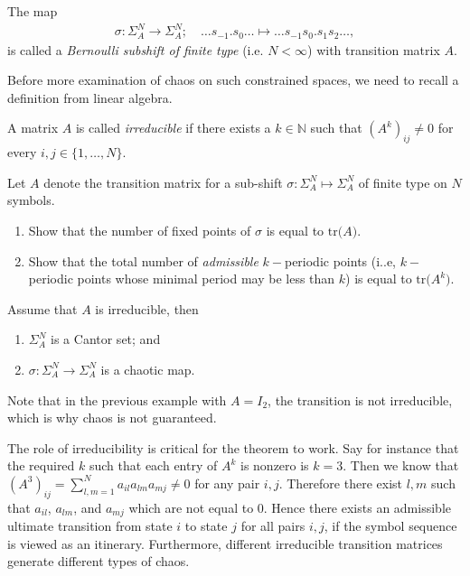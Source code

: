\begin{definition}
	The map
	\begin{align}
		\sigma:\Sigma_{A}^{N}\to \Sigma_{A}^{N};\quad \ldots s_{-1}\bm{.} s_0 \ldots \mapsto \ldots s_{-1} s_0 \bm{.} s_1 s_2 \ldots,
	\end{align}
	is called a \emph{Bernoulli subshift of finite type} (i.e. $N< \infty $) with transition matrix $A$.
\end{definition}
Before more examination of chaos on such constrained spaces, we need to recall a definition from linear algebra.
\begin{definition}
	A matrix $A$ is called \emph{irreducible} if there exists a $k \in \mathbb{N}$ such that $\left(A^{k}\right)_{ij}\neq 0$ for every $i,j\in \{1,\ldots,N\}$.
\end{definition}

\begin{exercise}
Let $A$ denote the transition matrix for a sub-shift $\sigma\colon\Sigma_{A}^{N}\mapsto\Sigma_{A}^{N}$ of finite type on $N$ symbols. 
\begin{enumerate}
\item Show that the number of fixed points of $\sigma$ is equal to $\textrm{tr(}A)$. 
\item Show that the total number of \emph{admissible} $k-$periodic points (i..e, $k-$periodic points whose minimal period may be less than $k$) is equal to $\textrm{tr(} A^{k})$. 
\end{enumerate}
\end{exercise}


\begin{theorem}[]
	Assume that $A$ is irreducible, then 
	\begin{enumerate}
		\item $\Sigma_{A}^{N}$ is a Cantor set; and
		\item $\sigma:\Sigma_{A}^{N}\to \Sigma_{A}^{N}$ is a chaotic map.
	\end{enumerate}
\end{theorem}

Note that in the previous example with $A=I_{2}$, the transition is not irreducible, which is why chaos is not guaranteed.

The role of irreducibility is critical for the theorem to work. Say for instance that the required $k$ such that each entry of $A^{k}$ is nonzero is $k=3$. Then we know that $\left(A^{3}\right)_{ij} = \sum_{l,m=1}^{N} a_{il}a_{lm}a_{mj} \neq 0$ for any pair $i,j$. Therefore there exist $l,m$ such that $a_{il}$, $a_{lm}$, and $a_{mj}$ which are not equal to 0. Hence there exists an admissible ultimate transition from state $i$ to state $j$ for all pairs $i,j$, if the symbol sequence is viewed as an itinerary. Furthermore, different irreducible transition matrices generate different types of chaos. 

